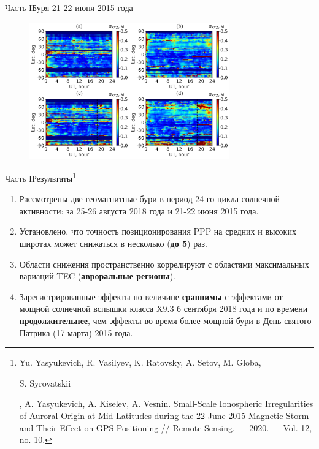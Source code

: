 \begin{frame}{\textsc{Часть I}}{Буря 21-22 июня 2015 года}
\begin{figure}
\includegraphics[width=0.77\textwidth]{../fig/2015-172-173.png}   
\end{figure} 
\end{frame}

\begin{frame}{\textsc{Часть I}}{Результаты\footnote[1]{{\tiny Yu. Yasyukevich, R. Vasilyev, K. Ratovsky, A. Setov, M. Globa, \begin{bf}S. Syrovatskii\end{bf}, A. Yasyukevich, A. Kiselev, A. Vesnin. Small-Scale Ionospheric Irregularities of Auroral Origin at Mid-Latitudes during the 22 June 2015 Magnetic Storm and Their Effect on GPS Positioning // \href{http://dx.doi.org/10.3390/rs12101579}{Remote Sensing}. --- 2020. --- Vol. 12, no. 10.}}}
\begin{enumerate}
\justifying
\item Рассмотрены две геомагнитные бури в период 24-го цикла солнечной активности: за 25-26 августа 2018 года и 21-22 июня 2015 года.
\item Установлено, что точность позиционирования PPP на средних и высоких широтах может снижаться в несколько (\textbf{до 5}) раз.
\item Области снижения пространственно коррелируют с областями максимальных вариаций TEC (\textbf{авроральные регионы}). 
\item Зарегистрированные эффекты по величине \textbf{сравнимы} с эффектами от мощной солнечной вспышки класса X9.3 6 сентября 2018 года и по времени \textbf{продолжительнее}, чем эффекты во время более мощной бури в День святого Патрика (17 марта) 2015 года.
\end{enumerate}  
\end{frame}